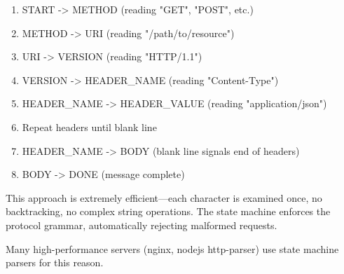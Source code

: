 \begin{enumerate}
    \item START -> METHOD (reading "GET", "POST", etc.)
    \item METHOD -> URI (reading "/path/to/resource")
    \item URI -> VERSION (reading "HTTP/1.1")
    \item VERSION -> HEADER\_NAME (reading "Content-Type")
    \item HEADER\_NAME -> HEADER\_VALUE (reading "application/json")
    \item Repeat headers until blank line
    \item HEADER\_NAME -> BODY (blank line signals end of headers)
    \item BODY -> DONE (message complete)
\end{enumerate}

This approach is extremely efficient---each character is examined once, no backtracking, no complex string operations. The state machine enforces the protocol grammar, automatically rejecting malformed requests.

Many high-performance servers (nginx, nodejs http-parser) use state machine parsers for this reason.

